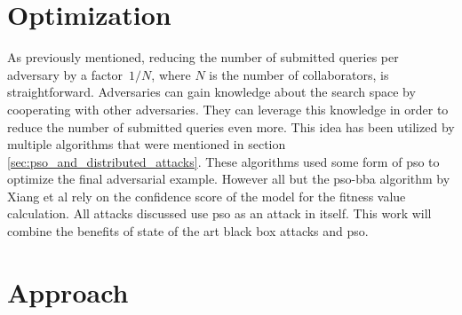 \section{Optimization}
As previously mentioned, reducing the number of submitted queries per adversary by a factor~$1/N$, where $N$ is the number of collaborators, is straightforward. Adversaries can gain knowledge about the search space by cooperating with other adversaries. They can leverage this knowledge in order to reduce the number of submitted queries even more. This idea has been utilized by multiple algorithms that were mentioned in section \ref{sec:pso_and_distributed_attacks}. These algorithms used some form of \gls{pso} to optimize the final adversarial example. However all but the \gls{pso}-\gls{bba} algorithm by Xiang et al \cite{distributed_pso_attack} rely on the confidence score of the model for the fitness value calculation. All attacks discussed use \gls{pso} as an attack in itself. This work will combine the benefits of state of the art black box attacks and \gls{pso}.

\section{Approach}